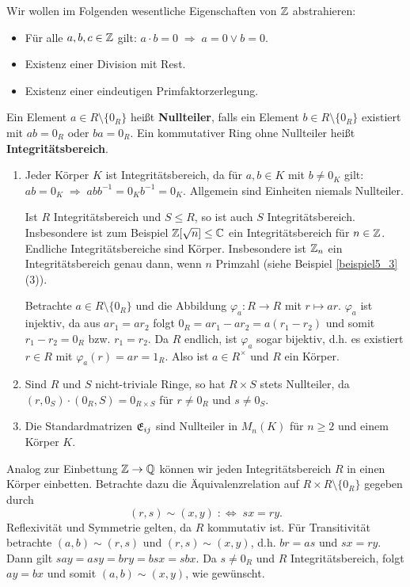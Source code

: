 \begin{leftbar}
		Wir wollen im Folgenden wesentliche Eigenschaften von $\mathbb{Z}$ abstrahieren:
	\begin{itemize}
		\item Für alle $a,b,c \in \mathbb{Z}$ gilt: $a \cdot b = 0 \;\Rightarrow\; a=0 \lor b=0$.
		\item Existenz einer Division mit Rest.
		\item Existenz einer eindeutigen Primfaktorzerlegung.
	\end{itemize}
\end{leftbar}
\begin{definition}
	Ein Element $a \in R \setminus \{0_R\}$ heißt \textbf{Nullteiler}, falls ein Element $b \in R \setminus \{0_R\}$ existiert mit $ab = 0_R$ oder $ba = 0_R$. Ein kommutativer Ring ohne Nullteiler heißt \textbf{Integritätsbereich}.
\end{definition}
\begin{beispiel}\label{beispiel5_5}
	\begin{enumerate}[label=(\arabic*)]
		\item Jeder Körper $K$ ist Integritätsbereich, da für $a,b \in K$ mit $b \neq 0_K$ gilt: $ab = 0_K \;\Rightarrow\; abb^{-1} = 0_K b^{-1} = 0_K$. Allgemein sind Einheiten niemals Nullteiler.
		
		Ist $R$ Integritätsbereich und $S \leq R$, so ist auch $S$ Integritätsbereich. Insbesondere ist zum Beispiel $\mathbb{Z}[\sqrt{n}] \leq \mathbb{C}$ ein Integritätsbereich für $n \in \mathbb{Z}$. Endliche Integritätsbereiche sind Körper. Insbesondere ist $\mathbb{Z}_n$ ein Integritätsbereich genau dann, wenn $n$ Primzahl (siehe Beispiel \ref{beispiel5_3} (3)).
		\begin{inlproof}
			Betrachte $a \in R \setminus \{0_R\}$ und die Abbildung $\varphi_a \colon R \to R$ mit $r \mapsto ar$. $\varphi_a$ ist injektiv, da aus $ar_1 = ar_2$ folgt $0_R = ar_1 - ar_2 = a(r_1 - r_2)$ und somit $r_1 - r_2 = 0_R$ bzw. $r_1 = r_2$. Da $R$ endlich, ist $\varphi_a$ sogar bijektiv, d.h. es existiert $r \in R$ mit $\varphi_a(r) = ar = 1_R$. Also ist $a \in R^\times$ und $R$ ein Körper.
		\end{inlproof}
		\item Sind $R$ und $S$ nicht-triviale Ringe, so hat $R \times S$ stets Nullteiler, da $(r,0_S) \cdot (0_R, S) = 0_{R \times S}$ für $r \neq 0_R$ und $s \neq 0_S$.
		\item Die Standardmatrizen $\mathfrak{E}_{ij}$ sind Nullteiler in $M_n(K)$ für $n \geq 2$ und einem Körper $K$.
	\end{enumerate}
\end{beispiel}
Analog zur Einbettung $\mathbb{Z} \to \mathbb{Q}$ können wir jeden Integritätsbereich $R$ in einen Körper einbetten. Betrachte dazu die Äquivalenzrelation auf $R \times R \setminus\{0_R\}$ gegeben durch
\[(r,s) \sim (x,y) \;:\Leftrightarrow\; sx = ry.\]
Reflexivität und Symmetrie gelten, da $R$ kommutativ ist. Für Transitivität betrachte $(a,b) \sim (r,s)$ und $(r,s) \sim (x,y)$, d.h. $br=as$ und $sx = ry$. Dann gilt $say = asy = bry = bsx = sbx$. Da $s \neq 0_R$ und $R$ Integritätsbereich, folgt $ay = bx$ und somit $(a,b) \sim (x,y)$, wie gewünscht.


